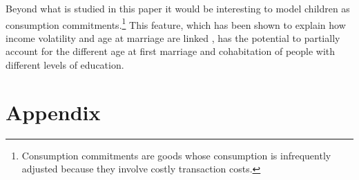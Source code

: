 \documentclass[12pt]{article}
\begin{document}
Beyond what is studied in this paper it would be interesting to model children as consumption commitments.\footnote{Consumption commitments are goods whose consumption is infrequently adjusted because they involve costly transaction costs.} This feature, which has been shown to explain how income volatility and age at marriage are linked \citep{santos2016}, has the potential to partially account for the different age at first marriage and cohabitation of people with different levels of education.

{\footnotesize	}
\appendix
{}
\section*{Appendix}
\end{document}

